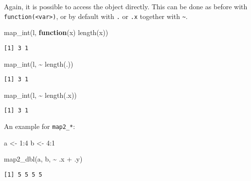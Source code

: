 \documentclass[ignorenonframetext,,t]{beamer}
\let\oldtextbf\textbf
\renewcommand{\textbf}[1]{\textcolor{spamwell}{\oldtextbf{#1}}}
\newenvironment{Shaded}{\begin{snugshade}}{\end{snugshade}}
\newcommand{\ControlFlowTok}[1]{\textcolor[rgb]{0.13,0.29,0.53}{\textbf{#1}}}
\newcommand{\DecValTok}[1]{\textcolor[rgb]{0.00,0.00,0.81}{#1}}
\newcommand{\FunctionTok}[1]{\textcolor[rgb]{0.00,0.00,0.00}{#1}}
\newcommand{\NormalTok}[1]{#1}
\newcommand{\OtherTok}[1]{\textcolor[rgb]{0.56,0.35,0.01}{#1}}
\newcommand{\SpecialCharTok}[1]{\textcolor[rgb]{0.00,0.00,0.00}{#1}}
\begin{document}
\begin{frame}[fragile]
Again, it is possible to access the object directly. This can be done as
before with \texttt{function(\textless{}var\textgreater{})}, or by
default with \texttt{.} or \texttt{.x} together with
\texttt{\textasciitilde{}}.

\begin{Shaded}
\begin{Highlighting}[]
\FunctionTok{map\_int}\NormalTok{(l, }\ControlFlowTok{function}\NormalTok{(x) }\FunctionTok{length}\NormalTok{(x))}
\end{Highlighting}
\end{Shaded}

\begin{verbatim}
[1] 3 1
\end{verbatim}

\begin{Shaded}
\begin{Highlighting}[]
\FunctionTok{map\_int}\NormalTok{(l, }\SpecialCharTok{\textasciitilde{}} \FunctionTok{length}\NormalTok{(.))}
\end{Highlighting}
\end{Shaded}

\begin{verbatim}
[1] 3 1
\end{verbatim}

\begin{Shaded}
\begin{Highlighting}[]
\FunctionTok{map\_int}\NormalTok{(l, }\SpecialCharTok{\textasciitilde{}} \FunctionTok{length}\NormalTok{(.x))}
\end{Highlighting}
\end{Shaded}

\begin{verbatim}
[1] 3 1
\end{verbatim}
\end{frame}

\begin{frame}[fragile]
An example for \texttt{map2\_*}:

\begin{Shaded}
\begin{Highlighting}[]
\NormalTok{a }\OtherTok{\textless{}{-}} \DecValTok{1}\SpecialCharTok{:}\DecValTok{4}
\NormalTok{b }\OtherTok{\textless{}{-}} \DecValTok{4}\SpecialCharTok{:}\DecValTok{1}

\FunctionTok{map2\_dbl}\NormalTok{(a, b, }\SpecialCharTok{\textasciitilde{}}\NormalTok{ .x }\SpecialCharTok{+}\NormalTok{ .y)}
\end{Highlighting}
\end{Shaded}

\begin{verbatim}
[1] 5 5 5 5
\end{verbatim}
\end{frame}
\end{document}
